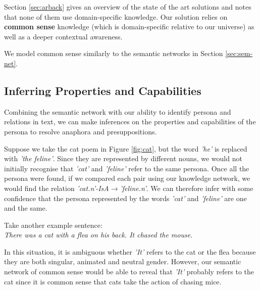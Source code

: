 Section \ref{sec:arback} gives an overview of the state of the art solutions and notes that none of them use domain-specific knowledge. Our solution relies on \textbf{common sense} knowledge (which is domain-specific relative to our universe) as well as a deeper contextual awareness.

We model common sense similarly to the semantic networks in Section \ref{sec:sem-net}.  


\subsection{Inferring Properties and Capabilities}

Combining the semantic network with our ability to identify persona and relations in text, we can make inferences on the properties and capabilities of the persona to resolve anaphora and presuppositions.

Suppose we take the cat poem in Figure \ref{fig:cat}, but the word \textit{'he'} is replaced with \textit{'the feline'}. Since they are represented by different nouns, we would not initially recognise that \textit{'cat'} and \textit{'feline'} refer to the same persona. Once all the persona were found, if we compared each pair using our knowledge network, we would find the relation \textit{'cat.n'-IsA$\rightarrow$'feline.n'}. We can therefore infer with some confidence that the persona represented by the words \textit{'cat'} and \textit{'feline'} are one and the same.

Take another example sentence:\\
\textit{There was a cat with a flea on his back. It chased the mouse.}

In this situation, it is ambiguous whether \textit{'It'} refers to the cat or the flea because they are both singular, animated and neutral gender. However, our semantic network of common sense would be able to reveal that \textit{'It'} probably refers to the cat since it is common sense that cats take the action of chasing mice.



